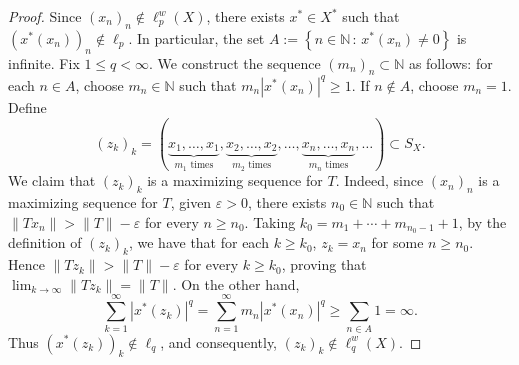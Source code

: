 \documentclass[10pt,a4paper]{amsart}
\newcommand {\N} {\mathbb{N}}
\newcommand{\conj}[2]{\left \{ {#1} \, : \, {#2} \right \}}
\newcommand{\norma}[1]{\| #1 \|}
\begin{document}
\begin{proof}
Since $(x_n)_n\notin \ell_p^w(X)$, there exists $x^*\in X^*$ such that $(x^*(x_n))_n\notin \ell_p.$
In particular, the set
$A:=\conj{n \in \N}{x^*(x_n) \neq 0}$
is infinite. Fix $1\leq q<\infty$. We construct the sequence $(m_n)_n \subset \N$ as follows: for each $n\in A$, choose $m_n\in\N$ such that  $m_n |x^*(x_n)|^q\geq 1$. If $n\notin A$, choose $m_n=1$. Define
$$ (z_k)_k   =  (\underbrace{x_1,\ldots,x_1}_{m_1\text{ times}},   \underbrace{x_2,\ldots,x_2}_{m_2\text{ times}},  \ldots,  \underbrace{x_n,\ldots,x_n}_{m_n\text{ times}},    \ldots) \subset S_X.$$
We claim that $(z_k)_k$ is a maximizing sequence for $T$. Indeed, since
$(x_n)_n$ is a maximizing sequence for $T$, given $\varepsilon > 0$, there exists $n_0 \in \N$ such that $\norma{Tx_n} > \norma{T} - \varepsilon$ for every $n \geq n_0$. Taking $k_0 = m_1 + \cdots + m_{n_0 -1} + 1$, by the definition of $(z_k)_k$, we have that for each $k \geq k_0$, $z_k = x_n$ for some $n \geq n_0$. Hence $\norma{Tz_k} > \norma{T} - \varepsilon$ for every $k \geq k_0$, proving that $\displaystyle \lim_{k \to \infty} \norma{Tz_k} = \norma{T}$.
On the other hand,
$$    \sum_{k=1}^{\infty} |x^*(z_k)|^q
    =
    \sum_{n=1}^{\infty} m_n |x^*(x_n)|^q
    \geq
    \sum_{n\in A} 1
    =
    \infty.$$
Thus $(x^*(z_k))_k\notin \ell_q$, and consequently,  $(z_k)_k\notin \ell_q^w(X).$
\end{proof}
\end{document}
